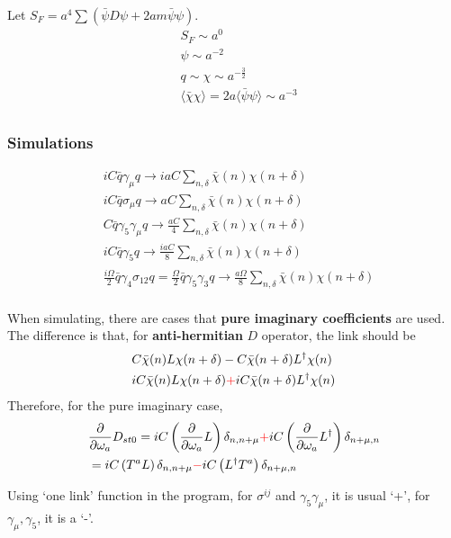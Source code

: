 Let $S_F= a^4 \sum \left(\bar{\psi} D \psi + 2am \bar{\psi}\psi\right)$.
\textcolor[rgb]{0,0,1}{
\begin{equation}
\begin{split}
&S_F\sim a^0\\
&\psi\sim a^{-2}\\
&q\sim \chi\sim a^{-\frac{3}{2}}\\
&\langle \bar{\chi}\chi \rangle  = 2 a \langle \bar{\psi}\psi \rangle \sim a^{-3}\\
\end{split}
\end{equation}
}

\subsubsection{\label{sec:gammakssimulations}Simulations}

\textcolor[rgb]{0,0,1}{
\begin{equation}
\begin{split}
&i C\bar{q}\gamma _{\mu}q \to i aC \sum _{n,\delta}\bar{\chi}(n)\chi (n+\delta)\\
&i C\bar{q}\sigma _{\mu}q \to a C \sum _{n,\delta}\bar{\chi}(n)\chi (n+\delta)\\
&C\bar{q}\gamma _5\gamma _{\mu}q \to \frac{aC}{4} \sum _{n,\delta}\bar{\chi}(n)\chi (n+\delta)\\
&iC\bar{q}\gamma _5 q \to \frac{iaC}{8} \sum _{n,\delta}\bar{\chi}(n)\chi (n+\delta)\\
&\frac{i\Omega}{2}\bar{q}\gamma _4\sigma _{12} q = \frac{\Omega}{2}\bar{q}\gamma _5\gamma _3 q \to \frac{a\Omega}{8} \sum _{n,\delta}\bar{\chi}(n)\chi (n+\delta)\\
\end{split}
\end{equation}
}

When simulating, there are cases that \textbf{\textcolor[rgb]{1,0,0}{pure imaginary coefficients}} are used.
The difference is that, for \textbf{anti-hermitian} $D$ operator, the link should be
\begin{equation}
\begin{split}
&C\bar{\chi}(n)L\chi (n+\delta) - C\bar{\chi}(n+\delta)L^{\dagger}\chi (n)\\
&iC\bar{\chi}(n)L\chi (n+\delta) \textcolor[rgb]{1,0,0}{+} iC\bar{\chi}(n+\delta)L^{\dagger}\chi (n)\\
\end{split}
\end{equation}
Therefore, for the pure imaginary case,
\begin{equation}
\begin{split}
&\frac{\partial }{\partial \omega _a}  D_{st0}=iC\left(\frac{\partial }{\partial \omega _a}L\right) \delta _{n,n+\mu} \textcolor[rgb]{1,0,0}{+}iC\left(\frac{\partial }{\partial \omega _a} L^{\dagger}\right)\delta _{n+\mu,n}\\
&=iC\left(T^aL\right) \delta _{n,n+\mu} \textcolor[rgb]{1,0,0}{-}iC\left(L^{\dagger}T^a\right)\delta _{n+\mu,n}\\
\end{split}
\end{equation}

Using `one link' function in the program, for $\sigma ^{ij}$ and $\gamma _5\gamma _{\mu}$, it is usual `+', for $\gamma _{\mu}, \gamma _5$, it is a `-'.